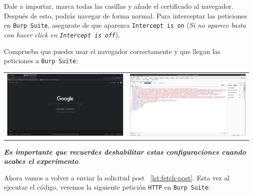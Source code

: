 \begin{enumerate}
    Dale a importar, marca todas las casillas y añade el certificado al navegador. Después de esto, podrás navegar de forma normal. Para interceptar las peticiones en \texttt{Burp Suite}, asegurate de que aparezca \texttt{Intercept is on} (\textit{Si no aparece basta con hacer click en \texttt{Intercept is off}}).

    Comprueba que puedes usar el navegador correctamente y que llegan las peticiones a \texttt{Burp Suite}:

    \begin{center}
        \begin{tabular}{l|r}
           \includegraphics[scale=0.08]{imagenes/Captura desde 2024-05-26 22-23-28.png}  &  \includegraphics[scale=0.08]{imagenes/Captura desde 2024-05-26 22-23-58.png}
        \end{tabular}
    \end{center}
\end{enumerate}

\textbf{\textit{Es importante que recuerdes deshabilitar estas configuraciones cuando acabes el experimento}}.

Ahora vamos a volver a enviar la solicitud post ~\ref{lst:fetch-post}. Esta vez al ejecutar el código, veremos la siguiente petición \texttt{HTTP} en \texttt{Burp Suite}:

